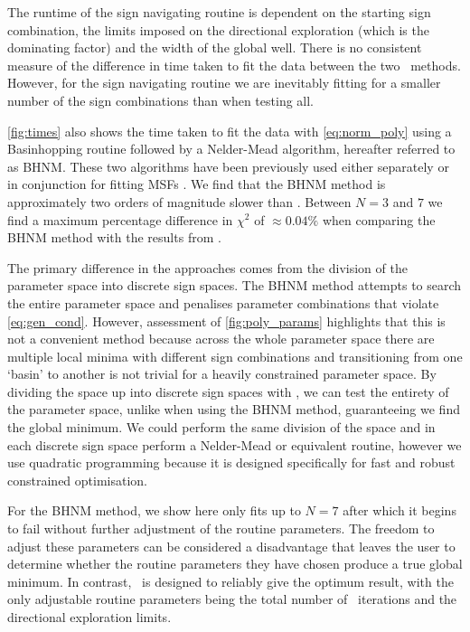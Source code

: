The runtime of the sign navigating routine is dependent on the starting sign combination, the limits imposed on the directional exploration (which is the dominating factor) and the width of the global well. There is no consistent measure of the difference in time taken to fit the data between the two \maxsmooth~methods. However, for the sign navigating routine we are inevitably fitting for a smaller number of the sign combinations than when testing all.

\cref{fig:times} also shows the time taken to fit the data with \cref{eq:norm_poly} using a Basinhopping routine followed by a Nelder-Mead algorithm, hereafter referred to as BHNM. These two algorithms have been previously used either separately or in conjunction for fitting MSFs \citep{Sathyanarayana2015, Sathyanarayana_msf_2017, Singh_edges_2019}. We find that the BHNM method is approximately two orders of magnitude slower than \maxsmooth. Between $N = 3$ and $7$ we find a maximum percentage difference in $\chi^2$ of $\approx 0.04\%$ when comparing the BHNM method with the results from \maxsmooth.

The primary difference in the approaches comes from the division of the parameter space into discrete sign spaces. The BHNM method attempts to search the entire parameter space and penalises parameter combinations that violate \cref{eq:gen_cond}. However, assessment of \cref{fig:poly_params} highlights that this is not a convenient method because across the whole parameter space there are multiple local minima with different sign combinations and transitioning from one `basin' to another is not trivial for a heavily constrained parameter space. By dividing the space up into discrete sign spaces with \maxsmooth, we can test the entirety of the parameter space, unlike when using the BHNM method, guaranteeing we find the global minimum. We could perform the same division of the space and in each discrete sign space perform a Nelder-Mead or equivalent routine, however we use quadratic programming because it is designed specifically for fast and robust constrained optimisation.

For the BHNM method, we show here only fits up to $N=7$ after which it begins to fail without further adjustment of the routine parameters. The freedom to adjust these parameters can be considered a disadvantage that leaves the user to determine whether the routine parameters they have chosen produce a true global minimum. In contrast, \maxsmooth~is designed to reliably give the optimum result, with the only adjustable routine parameters being the total number of \cvxopt~iterations and the directional exploration limits.

